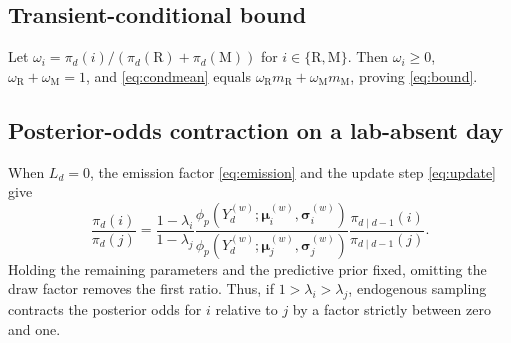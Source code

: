\documentclass{ieeeaccess}
\newcommand{\R}{\mathrm{R}}
\newcommand{\M}{\mathrm{M}}
\newcommand{\vect}[1]{\bm{#1}}
\begin{document}
\subsection{Transient-conditional bound}
Let $\omega_i=\pi_d(i)/(\pi_d(\R)+\pi_d(\M))$ for $i\in\{\R,\M\}$. Then $\omega_i\ge0$, $\omega_{\R}+\omega_{\M}=1$, and \eqref{eq:condmean} equals $\omega_{\R}m_{\R}+\omega_{\M}m_{\M}$, proving \eqref{eq:bound}.

\subsection{Posterior-odds contraction on a lab-absent day}\label{app:contraction}
When $L_d=0$, the emission factor \eqref{eq:emission} and the update step \eqref{eq:update} give
\begin{equation}
\frac{\pi_d(i)}{\pi_d(j)}=
\frac{1-\lambda_i}{1-\lambda_j}
\frac{\phi_p(Y_d^{(w)};\vect{\mu}_i^{(w)},\vect{\sigma}_i^{(w)})}
{\phi_p(Y_d^{(w)};\vect{\mu}_j^{(w)},\vect{\sigma}_j^{(w)})}
\frac{\pi_{d\mid d-1}(i)}{\pi_{d\mid d-1}(j)}.
\end{equation}
Holding the remaining parameters and the predictive prior fixed, omitting the draw factor removes the first ratio. Thus, if $1>\lambda_i>\lambda_j$, endogenous sampling contracts the posterior odds for $i$ relative to $j$ by a factor strictly between zero and one.
\end{document}
